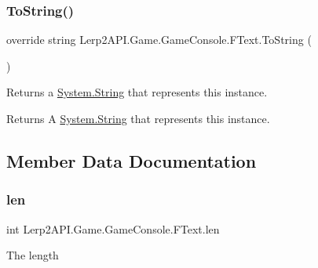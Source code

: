 \subsubsection{\texorpdfstring{To\+String()}{ToString()}}
{\footnotesize\ttfamily override string Lerp2\+A\+P\+I.\+Game.\+Game\+Console.\+F\+Text.\+To\+String (\begin{DoxyParamCaption}{ }\end{DoxyParamCaption})\hspace{0.3cm}{\ttfamily [inline]}}



Returns a \hyperlink{namespace_lerp2_a_p_i_1_1_game_a2f182da062f210cc43f341f6992ee293a27118326006d3829667a400ad23d5d98}{System.\+String} that represents this instance. 

\begin{DoxyReturn}{Returns}
A \hyperlink{namespace_lerp2_a_p_i_1_1_game_a2f182da062f210cc43f341f6992ee293a27118326006d3829667a400ad23d5d98}{System.\+String} that represents this instance.
\end{DoxyReturn}


\subsection{Member Data Documentation}
\mbox{\label{class_lerp2_a_p_i_1_1_game_1_1_game_console_1_1_f_text_ad79114144c9e6d45d1bd41f20b3c25b9}} 
\subsubsection{\texorpdfstring{len}{len}}
{\footnotesize\ttfamily int Lerp2\+A\+P\+I.\+Game.\+Game\+Console.\+F\+Text.\+len}



The length 

\mbox{\label{class_lerp2_a_p_i_1_1_game_1_1_game_console_1_1_f_text_a3e1ec23d73b4cae7b21608d3175da2b6}} 
